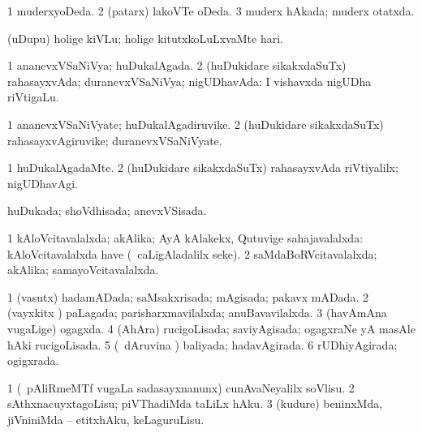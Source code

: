 \bentry
{} 
\gl{\gu}
\expl{}
\bmng
\bnum
\num{1} muderxyoDeda. 
\num{2} (patarx) lakoVTe oDeda. 
\num{3} muderx hAkada; muderx otatxda. 
\enum
\emng
\eentry

\bentry
{} 
\gl{\akirx}
\expl{}
\bmng
(uDupu) holige kiVLu; holige kitutxkoLuLxvaMte hari. 
\emng
\eentry

\bentry
{} 
\gl{\gu}
\expl{}
\bmng
\bnum
\num{1} ananevxVSaNiVya; huDukalAgada. 
\num{2} (huDukidare sikakxdaSuTx) rahasayxvAda; duranevxVSaNiVya; nigUDhavAda:  I vishavxda nigUDha riVtigaLu. 
\enum
\emng
\eentry

\bentry
{} 
\gl{\nA}
\expl{}
\bmng
\bnum
\num{1} ananevxVSaNiVyate; huDukalAgadiruvike. 
\num{2} (huDukidare sikakxdaSuTx) rahasayxvAgiruvike; duranevxVSaNiVyate. 
\enum
\emng
\eentry

\bentry
{} 
\gl{\kirxvi}
\expl{}
\bmng
\bnum
\num{1} huDukalAgadaMte. 
\num{2} (huDukidare sikakxdaSuTx) rahasayxvAda riVtiyalilx; nigUDhavAgi. 
\enum
\emng
\eentry

\bentry
{} 
\gl{\gu}
\expl{}
\bmng
huDukada; shoVdhisada; anevxVSisada. 
\emng
\eentry

\bentry
{} 
\gl{\gu}
\expl{}
\bmng
\bnum
\num{1} kAloVcitavalalxda; akAlika; AyA kAlakekx, Qutuvige sahajavalalxda:  kAloVcitavalalxda have (\udA\ caLigAladalilx seke). 
\num{2} saMdaBoRVcitavalalxda; akAlika; samayoVcitavalalxda. 
\enum
\emng
\eentry

\bentry
{} 
\gl{\gu}
\expl{}
\bmng
\bnum
\num{1} (vasutx) hadamADada; saMsakxrisada; mAgisada; pakavx mADada. 
\num{2} (vayxkitx ) paLagada; parisharxmavilalxda; anuBavavilalxda. 
\num{3} (havAmAna \mo vugaLige) ogagxda. 
\num{4} (AhAra) rucigoLisada; saviyAgisada; ogagxraNe yA masAle hAki rucigoLisada. 
\num{5} (\kanmu\ dAruvina \vi) baliyada; hadavAgirada. 
\num{6} rUDhiyAgirada; ogigxrada. 
\enum
\emng
\eentry

\bentry
{} 
\gl{\sakirx}
\expl{}
\bmng
\bnum
\num{1} (\kanmu\ pAliRmeMTf \mo vugaLa sadasayxnanunx) cunAvaNeyalilx soVlisu. 
\num{2} sAthxnacuyxtagoLisu; piVThadiMda taLiLx hAku. 
\num{3} (kudure) beninxMda, jiVniniMda -- etitxhAku, keLaguruLisu. 
\enum
\emng
\eentry

